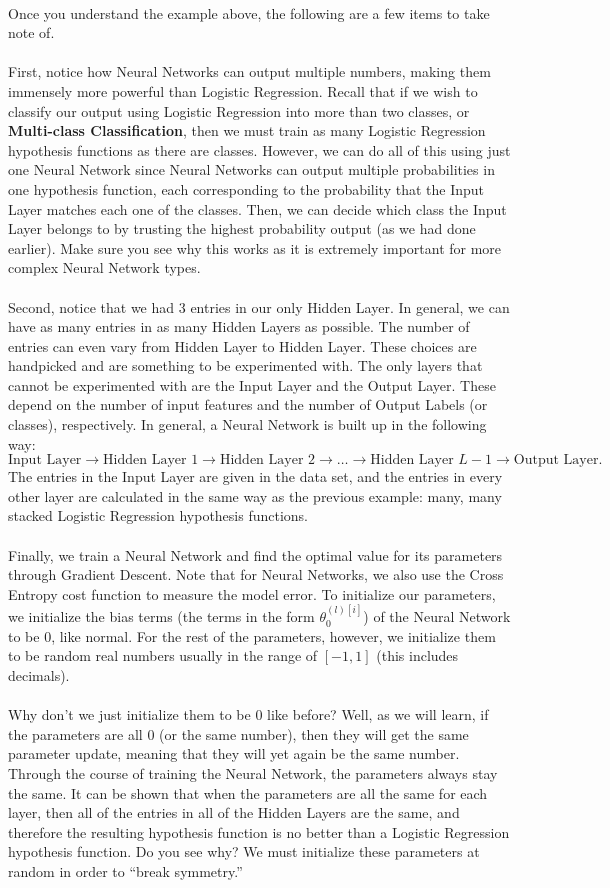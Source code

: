 \documentclass{article}
\begin{document}
\\
Once you understand the example above, the following are a few items to take note of. 
\\
\\
First, notice how Neural Networks can output multiple numbers, making them immensely more powerful than Logistic Regression. Recall that if we wish to classify our output using Logistic Regression into more than two classes, or \textbf{Multi-class Classification}, then we must train as many Logistic Regression hypothesis functions as there are classes. However, we can do all of this using just one Neural Network since Neural Networks can output multiple probabilities in one hypothesis function, each corresponding to the probability that the Input Layer matches each one of the classes. Then, we can decide which class the Input Layer belongs to by trusting the highest probability output (as we had done earlier). Make sure you see why this works as it is extremely important for more complex Neural Network types. 
\\
\\
Second, notice that we had 3 entries in our only Hidden Layer. In general, we can have as many entries in as many Hidden Layers as possible. The number of entries can even vary from Hidden Layer to Hidden Layer. These choices are handpicked and are something to be experimented with. The only layers that cannot be experimented with are the Input Layer and the Output Layer. These depend on the number of input features and the number of Output Labels (or classes), respectively. In general, a Neural Network is built up in the following way: 
\[\text{Input Layer}\to\text{Hidden Layer 1}\to\text{Hidden Layer 2}\to\ldots\to\text{Hidden Layer }L-1\to\text{Output Layer}.\]
The entries in the Input Layer are given in the data set, and the entries in every other layer are calculated in the same way as the previous example: many, many stacked Logistic Regression hypothesis functions. 
\\
\\
Finally, we train a Neural Network and find the optimal value for its parameters through Gradient Descent. Note that for Neural Networks, we also use the Cross Entropy cost function to measure the model error. To initialize our parameters, we initialize the bias terms (the terms in the form $\theta_0^{(l)[i]}$) of the Neural Network to be 0, like normal. For the rest of the parameters, however, we initialize them to be random real numbers usually in the range of $[-1,1]$ (this includes decimals). 
\\
\\
Why don't we just initialize them to be 0 like before? Well, as we will learn, if the parameters are all 0 (or the same number), then they will get the same parameter update, meaning that they will yet again be the same number. Through the course of training the Neural Network, the parameters always stay the same. It can be shown that when the parameters are all the same for each layer, then all of the entries in all of the Hidden Layers are the same, and therefore the resulting hypothesis function is no better than a Logistic Regression hypothesis function. Do you see why? We must initialize these parameters at random in order to ``break symmetry.''
\end{document}
